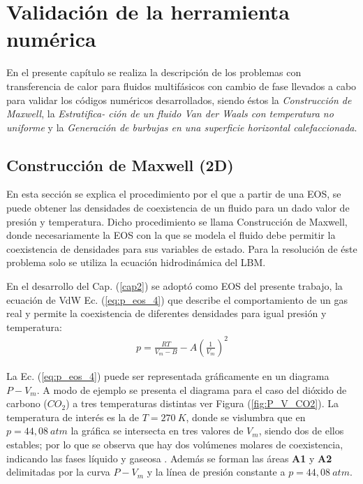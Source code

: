 \chapter{Validación de la herramienta numérica }
\graphicspath{{figs/cap4/}}
\label{cap4}

En el presente capítulo se realiza la descripción de los problemas con transferencia de calor para fluidos multifásicos con cambio de fase llevados a cabo para validar los códigos numéricos desarrollados, siendo éstos la \textit{Construcción de Maxwell}, la \textit{Estratifica- ción de un fluido Van der Waals con temperatura no uniforme} y la \textit{Generación de burbujas en una superficie horizontal calefaccionada}.

\section{Construcción de Maxwell (2D)}

En esta sección se explica el procedimiento por el que a partir de una EOS, se puede obtener las densidades de coexistencia de un fluido para un dado valor de presión y temperatura. Dicho procedimiento se llama Construcción de Maxwell, donde necesariamente la EOS con la que se modela el fluido debe permitir la coexistencia de densidades para sus variables de estado. Para la resolución de éste problema solo se utiliza la ecuación hidrodinámica del LBM.

En el desarrollo del Cap. (\ref{cap2}) se adoptó como EOS del presente trabajo, la ecuación de VdW Ec. (\ref{eq:p_eos_4}) que describe el comportamiento de un gas real y permite la coexistencia de diferentes densidades para igual presión y temperatura:
\begin{align}
	p = \frac{R T}{V_m - B} - A {\left(\frac{1}{V_m}\right)}^2
	\label{eq:p_eos_4}
\end{align}

La Ec. (\ref{eq:p_eos_4}) puede ser representada gráficamente en un diagrama $P - V_m$. A modo de ejemplo se presenta el diagrama para el caso del dióxido de carbono ($CO_2$) a tres temperaturas distintas ver Figura (\ref{fig:P_V_CO2}).  La temperatura de interés es la de $T = 270 \> K$, donde se vislumbra que en $p = 44,08 \> atm$ la gráfica se intersecta en tres valores de $V_m$, siendo dos de ellos estables; por lo que se observa que hay dos volúmenes molares de coexistencia, indicando las fases líquido y gaseosa \cite{huang2015multiphase}. Además se forman las áreas \textbf{A1} y \textbf{A2} delimitadas por la curva $P - V_m$ y la línea de presión constante a $p = 44,08 \> atm$. 

